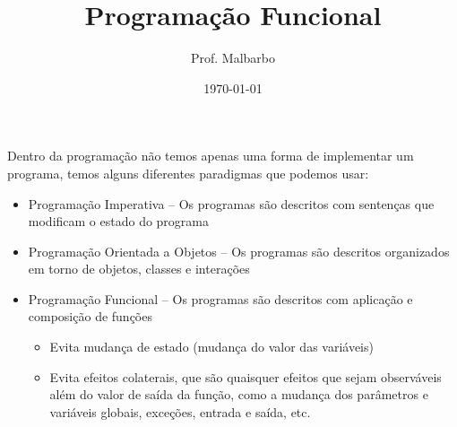 \documentclass[12pt]{article}
\title{Programação Funcional}
\author{Prof. Malbarbo}
\date{\today}
\begin{document}
\maketitle
\tableofcontents
\vspace{48pt}

Dentro da programação não temos apenas uma forma de implementar um programa, 
temos alguns diferentes paradigmas que podemos usar:
\begin{itemize}[label=$\rightarrow$]
    \item Programação Imperativa -- Os programas são descritos com sentenças 
    que modificam o estado do programa
    \item Programação Orientada a Objetos -- Os programas são descritos 
    organizados em torno de objetos, classes e interações
    \item Programação Funcional -- Os programas são descritos com aplicação 
    e composição de funções
    \begin{itemize}
        \item Evita mudança de estado (mudança do valor das variáveis)
        \item Evita efeitos colaterais, que são quaisquer efeitos que sejam 
        observáveis além do valor de saída da função, como a mudança dos 
        parâmetros e variáveis globais, exceções, entrada e saída, etc.
    \end{itemize} 
\end{itemize}
\end{document}
